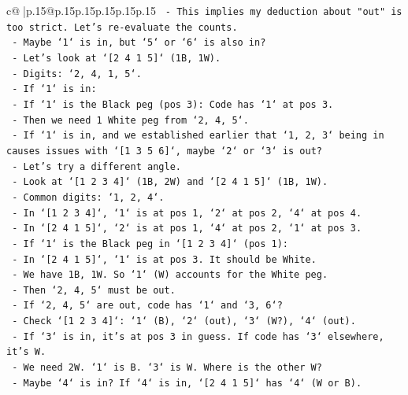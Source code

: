 \documentclass{article}
\begin{document}
{\begin{supertabular}{c@{$\;$}|p{.15\linewidth}@{}p{.15\linewidth}p{.15\linewidth}p{.15\linewidth}p{.15\linewidth}p{.15\linewidth}}
{{{\texttt{    {-} This implies my deduction about "out" is too strict. Let's re{-}evaluate the counts.} \\
\texttt{    {-} Maybe `1` is in, but `5` or `6` is also in?} \\
\texttt{    {-} Let's look at `{[}2 4 1 5{]}` (1B, 1W).} \\
\texttt{        {-} Digits: `2, 4, 1, 5`.} \\
\texttt{        {-} If `1` is in:} \\
\texttt{            {-} If `1` is the Black peg (pos 3): Code has `1` at pos 3.} \\
\texttt{            {-} Then we need 1 White peg from `2, 4, 5`.} \\
\texttt{            {-} If `1` is in, and we established earlier that `1, 2, 3` being in causes issues with `{[}1 3 5 6{]}`, maybe `2` or `3` is out?} \\
\texttt{            {-} Let's try a different angle.} \\
\texttt{            {-} Look at `{[}1 2 3 4{]}` (1B, 2W) and `{[}2 4 1 5{]}` (1B, 1W).} \\
\texttt{            {-} Common digits: `1, 2, 4`.} \\
\texttt{            {-} In `{[}1 2 3 4{]}`, `1` is at pos 1, `2` at pos 2, `4` at pos 4.} \\
\texttt{            {-} In `{[}2 4 1 5{]}`, `2` is at pos 1, `4` at pos 2, `1` at pos 3.} \\
\texttt{            {-} If `1` is the Black peg in `{[}1 2 3 4{]}` (pos 1):} \\
\texttt{                {-} In `{[}2 4 1 5{]}`, `1` is at pos 3. It should be White.} \\
\texttt{                {-} We have 1B, 1W. So `1` (W) accounts for the White peg.} \\
\texttt{                {-} Then `2, 4, 5` must be out.} \\
\texttt{                {-} If `2, 4, 5` are out, code has `1` and `3, 6`?} \\
\texttt{                {-} Check `{[}1 2 3 4{]}`: `1` (B), `2` (out), `3` (W?), `4` (out).} \\
\texttt{                {-} If `3` is in, it's at pos 3 in guess. If code has `3` elsewhere, it's W.} \\
\texttt{                {-} We need 2W. `1` is B. `3` is W. Where is the other W?} \\
\texttt{                {-} Maybe `4` is in? If `4` is in, `{[}2 4 1 5{]}` has `4` (W or B).} \\
}}}
\end{supertabular}}
\end{document}
